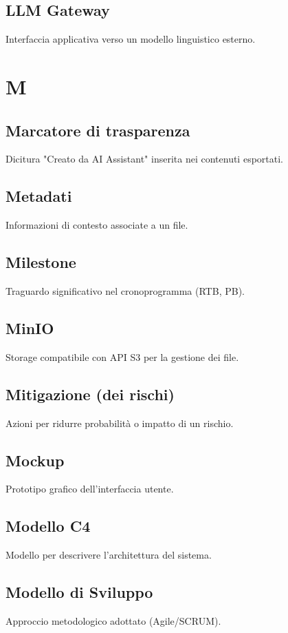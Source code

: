\documentclass[a4paper,12pt]{article}
\begin{document}
\subsection{LLM Gateway}
Interfaccia applicativa verso un modello linguistico esterno.

\section{M}
\subsection{Marcatore di trasparenza}
Dicitura "Creato da AI Assistant" inserita nei contenuti esportati.

\subsection{Metadati}
Informazioni di contesto associate a un file.

\subsection{Milestone}
Traguardo significativo nel cronoprogramma (RTB, PB).

\subsection{MinIO}
Storage compatibile con API S3 per la gestione dei file.

\subsection{Mitigazione (dei rischi)}
Azioni per ridurre probabilità o impatto di un rischio.

\subsection{Mockup}
Prototipo grafico dell'interfaccia utente.

\subsection{Modello C4}
Modello per descrivere l'architettura del sistema.

\subsection{Modello di Sviluppo}
Approccio metodologico adottato (Agile/SCRUM).
\end{document}
